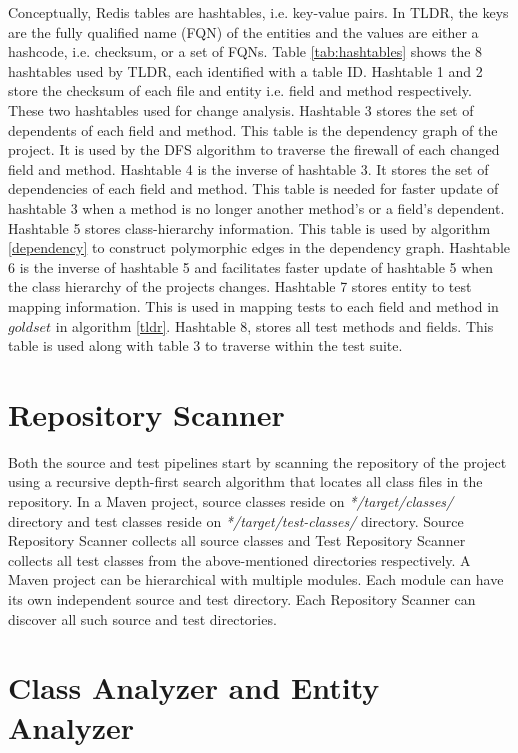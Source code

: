 Conceptually, Redis tables are hashtables, i.e. key-value pairs. In TLDR, the keys are the fully qualified name (FQN) of the entities and the values are either a hashcode, i.e. checksum, or a set of FQNs. Table \ref{tab:hashtables} shows the 8 hashtables used by TLDR, each identified with a table ID. Hashtable 1 and 2 store the checksum of each file and entity i.e. field and method respectively. These two hashtables used for change analysis. Hashtable 3 stores the set of dependents of each field and method. This table is the dependency graph of the project. It is used by the DFS algorithm to traverse the firewall of each changed field and method. Hashtable 4 is the inverse of hashtable 3. It stores the set of dependencies of each field and method. This table is needed for faster update of hashtable 3 when a method is no longer another method's or a field's dependent. Hashtable 5 stores class-hierarchy information. This table is used by algorithm \ref{dependency} to construct polymorphic edges in the dependency graph. Hashtable 6 is the inverse of hashtable 5 and facilitates faster update of hashtable 5 when the class hierarchy of the projects changes. Hashtable 7 stores entity to test mapping information. This is used in mapping tests to each field and method in $goldset$ in algorithm \ref{tldr}. Hashtable 8, stores all test methods and fields. This table is used along with table 3 to traverse within the test suite. 


\section{Repository Scanner}

\noindent
Both the source and test pipelines start by scanning the repository of the project using a recursive depth-first search algorithm that locates all class files in the repository. In a Maven project, source classes reside on \textit{*/target/classes/} directory and test classes reside on \textit{*/target/test-classes/} directory. Source Repository Scanner collects all source classes and Test Repository Scanner collects all test classes from the above-mentioned directories respectively. A Maven project can be hierarchical with multiple modules. Each module can have its own independent source and test directory. Each Repository Scanner can discover all such source and test directories. 

\section{ Class Analyzer and Entity Analyzer}


